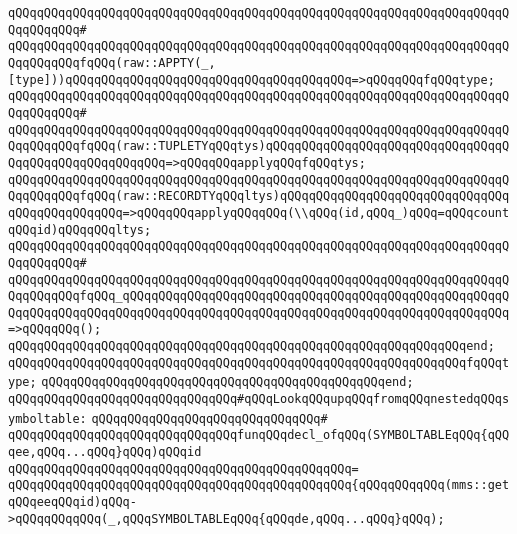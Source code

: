 \verb|qQQqqQQqqQQqqQQqqQQqqQQqqQQqqQQqqQQqqQQqqQQqqQQqqQQqqQQqqQQqqQQqqQQqqQQqqQQqqQQq#|\newline
\verb|qQQqqQQqqQQqqQQqqQQqqQQqqQQqqQQqqQQqqQQqqQQqqQQqqQQqqQQqqQQqqQQqqQQqqQQqqQQqqQQqfqQQq(raw::APPTY(_,[type]))qQQqqQQqqQQqqQQqqQQqqQQqqQQqqQQqqQQqqQQq=>qQQqqQQqfqQQqtype;|\newline
\verb|qQQqqQQqqQQqqQQqqQQqqQQqqQQqqQQqqQQqqQQqqQQqqQQqqQQqqQQqqQQqqQQqqQQqqQQqqQQqqQQq#|\newline
\verb|qQQqqQQqqQQqqQQqqQQqqQQqqQQqqQQqqQQqqQQqqQQqqQQqqQQqqQQqqQQqqQQqqQQqqQQqqQQqqQQqfqQQq(raw::TUPLETYqQQqtys)qQQqqQQqqQQqqQQqqQQqqQQqqQQqqQQqqQQqqQQqqQQqqQQqqQQqqQQq=>qQQqqQQqapplyqQQqfqQQqtys;|\newline
\verb|qQQqqQQqqQQqqQQqqQQqqQQqqQQqqQQqqQQqqQQqqQQqqQQqqQQqqQQqqQQqqQQqqQQqqQQqqQQqqQQqfqQQq(raw::RECORDTYqQQqltys)qQQqqQQqqQQqqQQqqQQqqQQqqQQqqQQqqQQqqQQqqQQqqQQq=>qQQqqQQqapplyqQQqqQQq(\\qQQq(id,qQQq_)qQQq=qQQqcountqQQqid)qQQqqQQqltys;|\newline
\verb|qQQqqQQqqQQqqQQqqQQqqQQqqQQqqQQqqQQqqQQqqQQqqQQqqQQqqQQqqQQqqQQqqQQqqQQqqQQqqQQq#|\newline
\verb|qQQqqQQqqQQqqQQqqQQqqQQqqQQqqQQqqQQqqQQqqQQqqQQqqQQqqQQqqQQqqQQqqQQqqQQqqQQqqQQqfqQQq_qQQqqQQqqQQqqQQqqQQqqQQqqQQqqQQqqQQqqQQqqQQqqQQqqQQqqQQqqQQqqQQqqQQqqQQqqQQqqQQqqQQqqQQqqQQqqQQqqQQqqQQqqQQqqQQqqQQqqQQqqQQq=>qQQqqQQq();|\newline
\verb|qQQqqQQqqQQqqQQqqQQqqQQqqQQqqQQqqQQqqQQqqQQqqQQqqQQqqQQqqQQqqQQqend;|\newline
\newline
\verb|qQQqqQQqqQQqqQQqqQQqqQQqqQQqqQQqqQQqqQQqqQQqqQQqqQQqqQQqqQQqqQQqfqQQqtype;|\newline
\verb|qQQqqQQqqQQqqQQqqQQqqQQqqQQqqQQqqQQqqQQqqQQqqQQqend;|\newline
\newline
\verb|qQQqqQQqqQQqqQQqqQQqqQQqqQQqqQQq#qQQqLookqQQqupqQQqfromqQQqnestedqQQqsymboltable:|\newline
\verb|qQQqqQQqqQQqqQQqqQQqqQQqqQQqqQQq#|\newline
\verb|qQQqqQQqqQQqqQQqqQQqqQQqqQQqqQQqfunqQQqdecl_ofqQQq(SYMBOLTABLEqQQq{qQQqee,qQQq...qQQq}qQQq)qQQqid|\newline
\verb|qQQqqQQqqQQqqQQqqQQqqQQqqQQqqQQqqQQqqQQqqQQqqQQq=|\newline
\verb|qQQqqQQqqQQqqQQqqQQqqQQqqQQqqQQqqQQqqQQqqQQqqQQq{qQQqqQQqqQQq(mms::getqQQqeeqQQqid)qQQq->qQQqqQQqqQQq(_,qQQqSYMBOLTABLEqQQq{qQQqde,qQQq...qQQq}qQQq);|\newline
